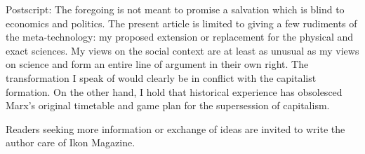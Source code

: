 Postscript: The foregoing is not meant to promise a salvation which is blind 
to economics and politics. The present article is limited to giving a few rudiments 
of the meta-technology: my proposed extension or replacement for the physical 
and exact sciences. My views on the social context are at least as unusual as my 
views on science and form an entire line of argument in their own right. The 
transformation I speak of would clearly be in conflict with the capitalist formation. 
On the other hand, I hold that historical experience has obsolesced Marx's original 
timetable and game plan for the supersession of capitalism. 


Readers seeking more information or exchange of ideas are invited to write the 
author care of Ikon Magazine. 


